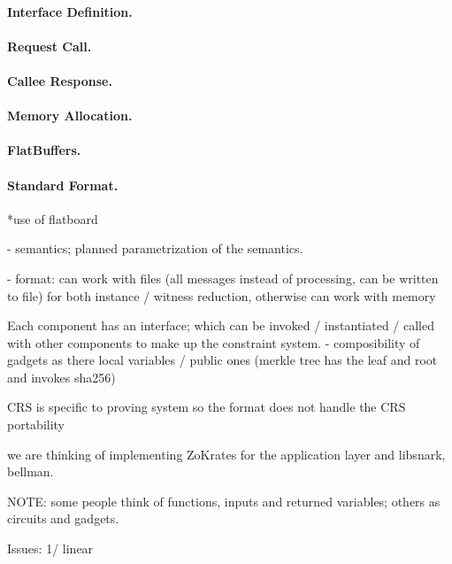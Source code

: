         \paragraph{Interface Definition.}
        
        \paragraph{Request Call.}

        \paragraph{Callee Response.}

        \paragraph{Memory Allocation.}

        \paragraph{FlatBuffers.}

        \paragraph{Standard Format.}

		*use of flatboard
		
		- semantics; planned parametrization of the semantics.
		
		- format: can work with files (all messages instead of processing, can be written to file) for both instance / witness reduction, otherwise can work with memory 
		
		Each component has an interface; which can be invoked / instantiated / called with other components to make up the constraint system.
			- composibility of gadgets as there local variables / public ones (merkle tree has the leaf and root and invokes sha256)
		
		CRS is specific to proving system so the format does not handle the CRS portability
		
		we are thinking of implementing ZoKrates for the application layer and libsnark, bellman.  
		
		NOTE: some people think of functions, inputs and returned variables; others as circuits and gadgets.
		
		
		Issues: 1/ linear 